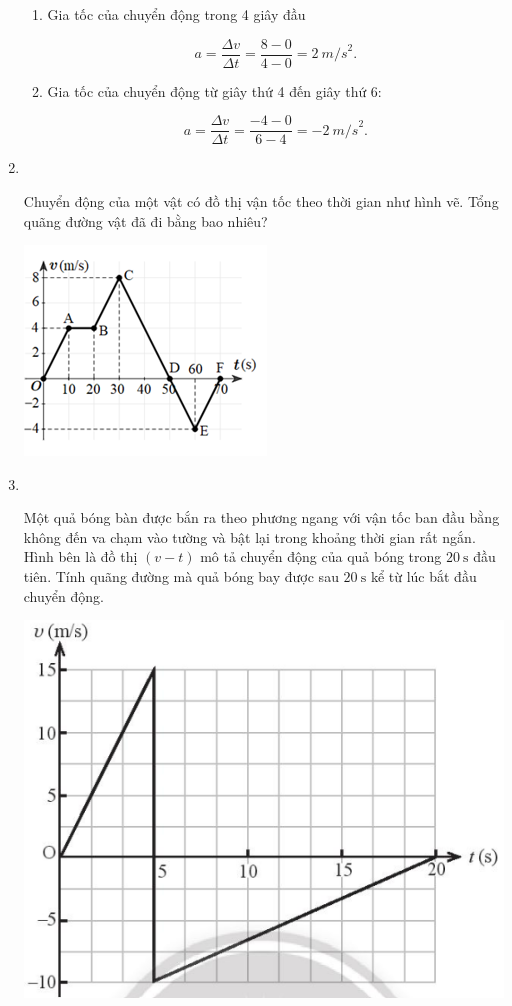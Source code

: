 \begin{enumerate}[label=\bfseries Bài \arabic*:]
{\begin{enumerate}[label=\alph*)]
\begin{itemize}
		Độ dịch chuyển bằng diện tích tam giác vuông có cạnh đáy là $t$ và chiều cao là $v$.
		
		$$d_2 = \dfrac{1}{2}v_2t_2 = -\SI{4}{m}.$$
		\item Trong 3 giây cuối:
		
		Độ dịch cuyển bằng diện tích hình chữ nhật có chiều dài là $t$ và chiều rộng là $v$.
		
		$$d_3 = \dfrac{1}{2}v_3t_3 = -\SI{12}{m}.$$
	\end{itemize}
\item Gia tốc của chuyển động trong 4 giây đầu

$$a = \dfrac{\Delta v}{\Delta t} =\dfrac{8 - 0}{4-0}= \SI{2}{m/s}^2.$$
\item Gia tốc của chuyển động từ giây thứ 4 đến giây thứ 6:

$$a = \dfrac{\Delta v}{\Delta t} =\dfrac{-4 - 0}{6-4}= -\SI{2}{m/s}^2.$$
		\end{enumerate}
		
	}
	
	\item {}\\
	{Chuyển động của một vật có đồ thị vận tốc theo thời gian như hình vẽ. Tổng quãng đường vật đã đi bằng bao nhiêu?
		\begin{center}
			\includegraphics[width=0.3\linewidth]{../figs/VN10-2022-PH-TP008-P-8}
		\end{center}
	
}

\item {}\\
{Một quả bóng bàn được bắn ra theo phương ngang với vận tốc ban đầu bằng không đến va chạm vào tường và bật lại trong khoảng thời gian rất ngắn. Hình bên là đồ thị $\left(v-t\right)$ mô tả chuyển động của quả bóng trong $\SI{20}{\second}$ đầu tiên. Tính quãng đường mà quả bóng bay được sau $\SI{20}{\second}$ kể từ lúc bắt đầu chuyển động.
	\begin{center}
		\includegraphics[width=0.4\linewidth]{../figs/VN10-2022-PH-TP008-P-10}
	\end{center}

}
\end{enumerate}